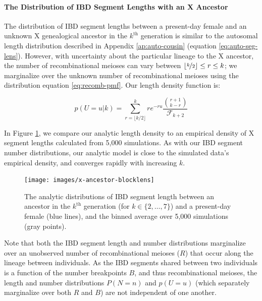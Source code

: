 \documentclass[9pt,twocolumn,twoside]{gsajnl}
\begin{document}
\paragraph{The Distribution of IBD Segment Lengths with an X Ancestor}

The distribution of IBD segment lengths between a present-day female and an
unknown X genealogical ancestor in the $k^\text{th}$ generation is similar to
the autosomal length distribution described in Appendix \ref{ap:auto-cousin}
(equation \ref{eq:auto-seg-lens}). However, with uncertainty about the
particular lineage to the X ancestor, the number of recombinational meioses can
vary between $\lfloor \nicefrac{k}{2} \rfloor \le r \le k$; we marginalize over
the unknown number of recombinational meioses using the distribution equation
\eqref{eq:recomb-pmf}. Our length density function is:

\begin{equation}
  \label{eq:x-anc-length}
  p(U = u | k) = \sum_{r=\lfloor k/2 \rfloor}^k  r e^{-ru} \frac{{r+1 \choose k-r}}{\mathcal{F}_{k+2}} 
\end{equation}

In Figure \ref{fig:x-len-dist}, we compare our analytic length density to an
empirical density of X segment lengths calculated from 5,000 simulations. As
with our IBD segment number distributions, our analytic model is close to the
simulated data's empirical density, and converges rapidly with increasing $k$.

\begin{figure}[!ht]
  \centering
  \texttt{[image: images/x-ancestor-blocklens]}

  \caption{The analytic distributions of IBD segment length between an ancestor
  in the $k^\text{th}$ generation (for $k \in \{2, \ldots, 7\}$) and a
  present-day female (blue lines), and the binned average over 5,000
  simulations (gray points).}

  \label{fig:x-len-dist}
\end{figure}

Note that both the IBD segment length and number distributions marginalize over
an unobserved number of recombinational meioses ($R$) that occur along the
lineage between individuals. As the IBD segments shared between two individuals
is a function of the number breakpoints $B$, and thus recombinational meioses,
the length and number distributions $P(N = n)$ and $p(U = u)$ (which separately
marginalize over both $R$ and $B$) are not independent of one another.
\end{document}
